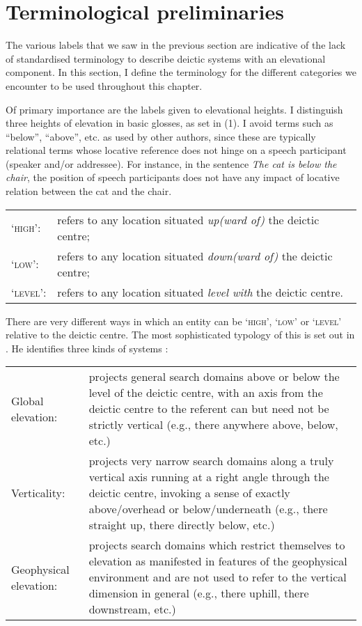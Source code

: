 \section{Terminological preliminaries}
The various labels that we saw in the previous section are indicative of the lack of standardised terminology to describe deictic systems with an elevational component. In this section, I define the terminology for the different categories we encounter to be used throughout this chapter.

Of primary importance are the labels given to elevational heights. I distinguish three heights of elevation in basic glosses, as set in (1). I avoid terms such as ``below'', ``above'', etc. as used by other authors, since these are typically relational terms whose locative reference does not hinge on a speech participant (speaker and/or addressee). For instance, in the sentence \textit{The cat is below the chair}, the position of speech participants does not have any impact of locative relation between the cat and the chair.




\ea
\begin{tabular}{ll}
`\textsc{high}': & refers to any location situated \textit{up(ward of)} the deictic centre;\\
`\textsc{low}': & refers to any location situated \textit{down(ward of)} the deictic centre;\\
`\textsc{level}': & refers to any location situated \textit{level with} the deictic centre.\\
\end{tabular}
\z


There are very different ways in which an entity can be `\textsc{high}', `\textsc{low}' or `\textsc{level}' relative to the deictic centre. The most sophisticated typology of this is set out in \citet{Burenhult2008}. He identifies three kinds of systems \citep[110-111]{Burenhult2008}:




\ea
\begin{tabular}{p{2cm}p{8cm}}
 Global \newline elevation: & projects general search domains above or below the level of the deictic centre, with an axis from the deictic centre to the referent can but need not be strictly vertical (e.g., there anywhere above, below, etc.)\\
 Verticality: & projects very narrow search domains along a truly vertical axis running at a right angle through the deictic centre, invoking a sense of exactly above/overhead or below/underneath (e.g., there straight up, there directly below, etc.)\\
 Geophysical elevation: & projects search domains which restrict themselves to elevation as manifested in features of the geophysical environment and are not used to refer to the vertical dimension in general (e.g., there uphill, there downstream, etc.)\\
\end{tabular}
\z


